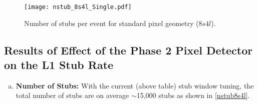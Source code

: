 \begin{table}[tb]
\vspace{1em}

\centering\scriptsize
{}
\caption{Stub window tunings for CMSSW\_9\_3\_2. Shown are the SW values for TEDD (top table) and for the OT barrel (below). Obtained from \href{https://github.com/cms-sw/cmssw/blob/CMSSW\_9\_3\_X/L1Trigger/TrackTrigger/python/TTStubAlgorithmRegister\_cfi.py} {this github repository}.}
\label{SWtable}
\end{table}

\vspace{1em}

\begin{figure}[H]
\begin{center}
\texttt{[image: nstub\_8s4l\_Single.pdf]} 
\caption{Number of stubs per event for standard pixel geometry ($8s4l$).}
\label{nstub8s4l} 
\end{center}
\end{figure}

\subsection{Results of Effect of the Phase 2 Pixel Detector on the L1 Stub Rate}

\begin{enumerate}[(a),start=1]
	\item{\textbf{Number of Stubs:} With the current (above table) stub window tuning, the total number of stubs are on average $\sim$15,000 stubs as shown in \autoref{nstub8s4l}.}
\end{enumerate}

